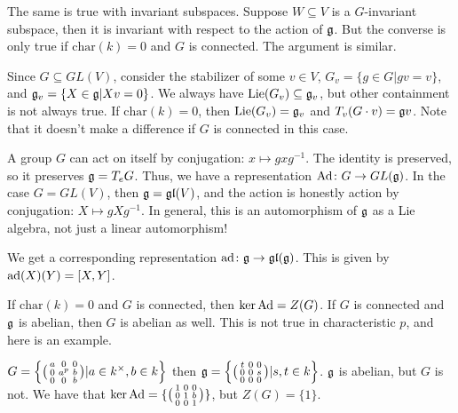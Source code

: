 The same is true with invariant subspaces. Suppose $W\subseteq V$ is a $G$-invariant subspace, then it is invariant with respect to the action of $\mathfrak{g}$. But the converse is only true if $\mathrm{char}(k)=0$ and $G$ is connected. The argument is similar.

Since $G\subseteq GL(V)$, consider the stabilizer of some $v\in V$, $G_v=\{g\in G|gv=v\}$, and $\mathfrak{g}_v=\{X\in \mathfrak{g}|Xv=0\}$. We always have $\operatorname{Lie}(G_v)\subseteq \mathfrak{g}_v$, but other containment is not always true. If $\mathrm{char}(k)=0$, then $\operatorname{Lie}(G_v)=\mathfrak{g}_v$ and $T_v(G\cdot v)=\mathfrak{g} v$. Note that it doesn't make a difference if $G$ is connected in this case.

\begin{example}
 A group $G$ can act on itself by conjugation: $x\mapsto gxg^{-1}$. The identity is preserved, so it preserves $\mathfrak{g}=T_e G$. Thus, we have a representation $\mathrm{Ad}\colon G\to GL(\mathfrak{g})$. In the case $G=GL(V)$, then $\mathfrak{g}=\mathfrak{gl}(V)$, and the action is honestly action by conjugation: $X\mapsto gXg^{-1}$. In general, this is an automorphism of $\mathfrak{g}$ as a Lie algebra, not just a linear automorphism!
 
 We get a corresponding representation $\mathrm{ad}\colon \mathfrak{g}\to \mathfrak{gl}(\mathfrak{g})$. This is given by $\mathrm{ad}(X)(Y)=[X,Y]$.
\end{example}
If $\mathrm{char}(k)=0$ and $G$ is connected, then $\ker \mathrm{Ad}=Z(G)$. If $G$ is connected and $\mathfrak{g}$ is abelian, then $G$ is abelian as well. This is not true in characteristic $p$, and here is an example.
\begin{example}
 $G = \Bigl\{\bigl(\begin{smallmatrix} a&0&0\\ 0&a^p& b\\ 0&0&b \end{smallmatrix}\bigr)|a\in k^\times, b\in k\Bigr\}$ then $\mathfrak{g} = \Bigl\{ \bigl(\begin{smallmatrix} t&0&0\\ 0&0&s\\ 0&0&0 \end{smallmatrix}\bigr) | s,t\in k\Bigr\}$. $\mathfrak{g}$ is abelian, but $G$ is not. We have that $\ker \mathrm{Ad} = \{\bigl(\begin{smallmatrix} 1&0&0\\ 0&1&b\\0&0&1 \end{smallmatrix}\bigr)\}$, but $Z(G)=\{1\}$.
\end{example}


